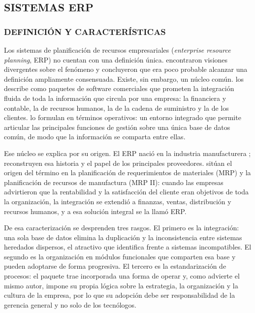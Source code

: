 \subsection{SISTEMAS ERP}
\subsubsection{DEFINICIÓN Y CARACTERÍSTICAS}

Los sistemas de planificación de recursos empresariales (\textit{enterprise resource planning}, ERP) no cuentan con una definición única. \textcite{Klaus2000} encontraron visiones divergentes sobre el fenómeno y concluyeron que era poco probable alcanzar una definición ampliamente consensuada. Existe, sin embargo, un núcleo común. \textcite{Davenport1998} los describe como paquetes de software comerciales que prometen la integración fluida de toda la información que circula por una empresa: la financiera y contable, la de recursos humanos, la de la cadena de suministro y la de los clientes. \textcite{Shi2003} lo formulan en términos operativos: un entorno integrado que permite articular las principales funciones de gestión sobre una única base de datos común, de modo que la información se comparta entre ellas.

Ese núcleo se explica por su origen. El ERP nació en la industria manufacturera \parencite{Shi2003}; \textcite{Jacobs2007} reconstruyen esa historia y el papel de los principales proveedores. \textcite{Klaus2000} sitúan el origen del término en la planificación de requerimientos de materiales (MRP) y la planificación de recursos de manufactura (MRP II): cuando las empresas advirtieron que la rentabilidad y la satisfacción del cliente eran objetivos de toda la organización, la integración se extendió a finanzas, ventas, distribución y recursos humanos, y a esa solución integral se la llamó ERP\@.

De esa caracterización se desprenden tres rasgos. El primero es la integración: una sola base de datos elimina la duplicación y la inconsistencia entre sistemas heredados dispersos, el atractivo que \textcite{Davenport1998} identifica frente a sistemas incompatibles. El segundo es la organización en módulos funcionales que comparten esa base y pueden adoptarse de forma progresiva. El tercero es la estandarización de procesos: el paquete trae incorporada una forma de operar y, como advierte el mismo autor, impone su propia lógica sobre la estrategia, la organización y la cultura de la empresa, por lo que su adopción debe ser responsabilidad de la gerencia general y no solo de los tecnólogos.

